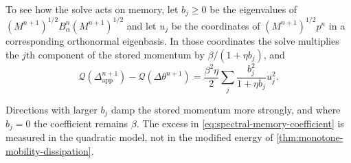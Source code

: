 To see how the solve acts on memory, let \(b_j\geq0\) be the eigenvalues of
\((M^{n+1})^{1/2}B_\alpha^n(M^{n+1})^{1/2}\) and let \(u_j\) be the
coordinates of \((M^{n+1})^{1/2}p^n\) in a corresponding orthonormal
eigenbasis. In those coordinates the solve multiplies the \(j\)th component
of the stored momentum by \(\beta/(1+\eta b_j)\), and
\begin{equation}
  \mathcal Q(\Delta_{\mathrm{app}}^{n+1})-\mathcal Q(\Delta\theta^{n+1})
  =\frac{\beta^2\eta}{2}
  \sum_j\frac{b_j^2}{1+\eta b_j}u_j^2 .
  \label{eq:spectral-memory-coefficient}
\end{equation}

\begin{remark}
\label{rem:memory-damping}
Directions with larger \(b_j\) damp the stored momentum more strongly, and
where \(b_j=0\) the coefficient remains \(\beta\). The excess in
\cref{eq:spectral-memory-coefficient} is measured in the quadratic model, not
in the modified energy of \cref{thm:monotone-mobility-dissipation}.
\end{remark}
